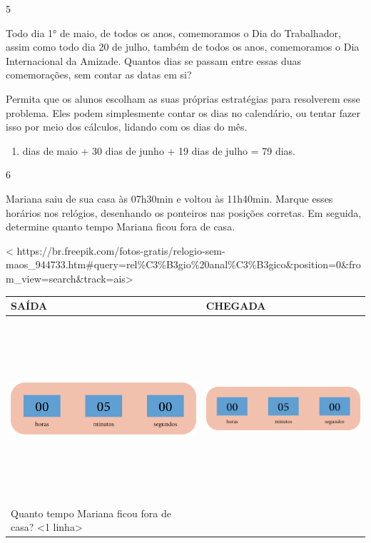 {{{{{\num{5}

Todo dia 1° de maio, de todos os anos, comemoramos o Dia do Trabalhador,
assim como todo dia 20 de julho, também de todos os anos, comemoramos o
Dia Internacional da Amizade. Quantos dias se passam entre essas duas
comemorações, sem contar as datas em si?

Permita que os alunos escolham as suas próprias
estratégias para resolverem esse problema. Eles podem simplesmente
contar os dias no calendário, ou tentar fazer isso por meio dos
cálculos, lidando com os dias do mês.

\begin{enumerate}
\def\labelenumi{\arabic{enumi}.}
\setcounter{enumi}{30}
\item
  dias de maio + 30 dias de junho + 19 dias de julho = 79 dias.
\end{enumerate}

\num{6}

Mariana saiu de sua casa às 07h30min e voltou às 11h40min. Marque esses
horários nos relógios, desenhando os ponteiros nas posições
corretas. Em seguida, determine quanto tempo Mariana ficou fora de casa.

\textless{}
https://br.freepik.com/fotos-gratis/relogio-sem-maos\_944733.htm\#query=rel\%C3\%B3gio\%20anal\%C3\%B3gico\&position=0\&from\_view=search\&track=ais\textgreater{}

\begin{longtable}[]{@{}ll@{}}
\toprule
SAÍDA & CHEGADA\tabularnewline
\midrule
\endhead
\includegraphics[width=2.71875in,height=2.65625in]{media/image61.png} &
\includegraphics[width=2.71875in,height=2.65625in]{media/image61.png}\tabularnewline
\begin{minipage}[t]{0.48\columnwidth}\raggedright\strut
Quanto tempo Mariana ficou fora de casa? \textless{}1
linha\textgreater{}


\end{minipage}
\end{longtable}}}}}}
